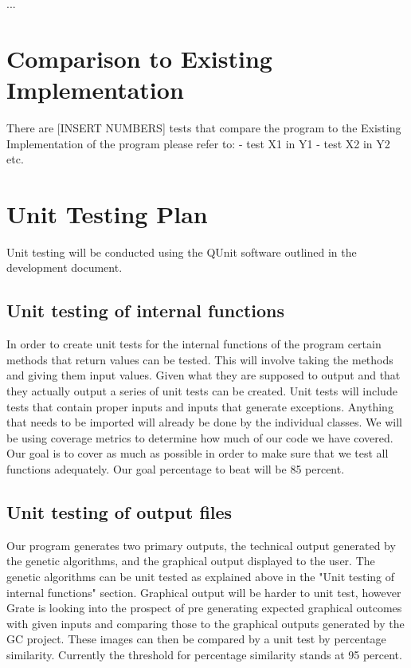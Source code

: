 \documentclass[12pt, titlepage]{article}
\begin{document}
...

	
\section{Comparison to Existing Implementation}	

There are [INSERT NUMBERS] tests that compare the program to the Existing Implementation of the program please refer to:
- test X1 in Y1
- test X2 in Y2
etc.
				
\section{Unit Testing Plan}

Unit testing will be conducted using the QUnit software outlined in the development document.
		
\subsection{Unit testing of internal functions}

In order to create unit tests for the internal functions of the program certain methods that return values
can be tested. This will involve taking the methods and giving them input values. Given what they are
supposed to output and that they actually output a series of unit tests can be created. Unit tests will include
tests that contain proper inputs and inputs that generate exceptions.  Anything that needs to be imported will already be done
by the individual classes. We will be using coverage metrics to determine how much of our code we have
covered. Our goal is to cover as much as possible in order to make sure that we test all functions adequately.
Our goal percentage to beat will be 85 percent.
		
\subsection{Unit testing of output files}		

Our program generates two primary outputs, the technical output generated by the genetic algorithms, and the graphical output displayed to the user. The genetic algorithms can be unit tested as explained above in the "Unit testing of internal functions" section. Graphical output will be harder to unit test, however Grate is looking into the prospect of pre generating expected graphical outcomes with given inputs and comparing those to the graphical outputs generated by the GC project. These images can then be compared by a unit test by percentage similarity. Currently the threshold for percentage similarity stands at 95 percent.
\end{document}
